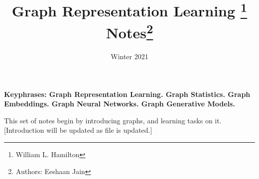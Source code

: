 \documentclass[nobib]{tufte-handout}
\title{Graph Representation Learning
       \thanks{William L. Hamilton} \\
       \Large Notes\thanks{Authors: Eeshaan Jain}}
\date{Winter 2021} %
\newtheorem[M]{definition}{Definition}[section]
\begin{document}
\maketitle%



\textbf{Keyphrases: Graph Representation Learning. Graph Statistics. Graph Embeddings. Graph Neural Networks. Graph Generative Models.}

This set of notes begin by introducing graphs, and learning tasks on it. [Introduction will be updated as file is updated.]
\tableofcontents




\nocite{*}
\footnotesize


\end{document}
